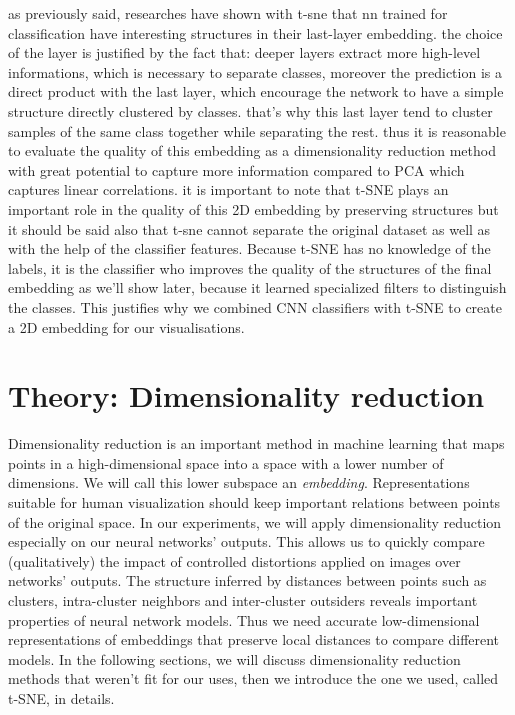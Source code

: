 \documentclass[a4paper,12pt]{report}
\begin{document}
as previously said, researches have shown with t-sne that nn trained for classification have interesting structures in their last-layer embedding.
the choice of the layer is justified by the fact that: deeper layers extract more high-level informations, which is necessary to separate classes, moreover the prediction is a direct product with the last layer, which encourage the network to have a simple structure directly clustered by classes.
that's why this last layer tend to cluster samples of the same class together while separating the rest\cite{donahue2013decaf}\cite{yu2014visualizing}.
thus it is reasonable to evaluate the quality of this embedding as a dimensionality reduction method with great potential to capture more information compared to PCA which captures linear correlations.
it is important to note that t-SNE plays an important role in the quality of this 2D embedding by preserving structures but it should be said also that t-sne cannot separate the original dataset as well as with the help of the classifier features.
Because t-SNE has no knowledge of the labels, it is the classifier who improves the quality of the structures of the final embedding as we'll show later, because it learned specialized filters to distinguish the classes.
This justifies why we combined CNN classifiers with t-SNE to create a 2D embedding for our visualisations.


\chapter{Theory: Dimensionality reduction}
Dimensionality reduction is an important method in machine learning that maps points in a high-dimensional space into a space with a lower number of dimensions.
We will call this lower subspace an {\em embedding}.
Representations suitable for human visualization should keep important relations between points of the original space.
In our experiments, we will apply dimensionality reduction especially on our neural networks' outputs.
This allows us to quickly compare (qualitatively) the impact of controlled distortions applied on images over networks' outputs.
The structure inferred by distances between points such as clusters, intra-cluster neighbors and inter-cluster outsiders reveals important properties of neural network models.
Thus we need accurate low-dimensional representations of embeddings that preserve local distances to compare different models.
In the following sections, we will discuss dimensionality reduction methods that weren't fit for our uses, then we introduce the one we used, called t-SNE, in details.
\end{document}

